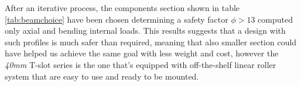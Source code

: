 	After an iterative process, the components section shown in table \ref{tab:beamchoice} have been chosen determining a safety factor $\phi > 13$ computed only axial and bending internal loads. This results suggests that a design with such profiles is much safer than required, meaning that also smaller section could have helped us achieve the same goal with less weight and cost, however the \textit{40mm} T-slot series is the one that's equipped with off-the-shelf linear roller system that are easy to use and ready to be mounted.
	
	
	
	

	
	
	
	
	
	
	
	
	
	
	
	
	
	
	
	
	
	
	
	
	
	
	
	
	
	
	
	
	
	
	
	